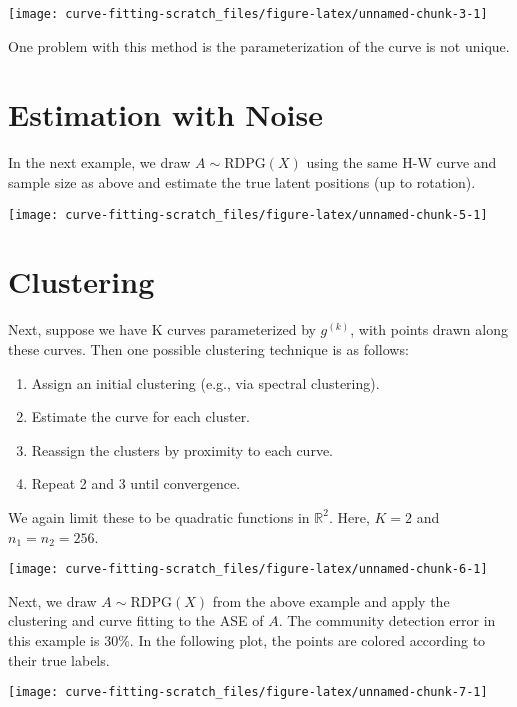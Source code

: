 \documentclass[
  11pt,
]{article}
\providecommand{\tightlist}{%
  \setlength{\itemsep}{0pt}\setlength{\parskip}{0pt}}
\begin{document}
\begin{center}\texttt{[image: curve-fitting-scratch\_files/figure-latex/unnamed-chunk-3-1]} \end{center}

One problem with this method is the parameterization of the curve is not
unique.

\hypertarget{estimation-with-noise}{%
\section{Estimation with Noise}\label{estimation-with-noise}}

\begin{example}

In the next example, we draw $A \sim \mathrm{RDPG}(X)$ using the same H-W curve and sample size as above and estimate the true latent positions (up to rotation). 

\end{example}

\begin{center}\texttt{[image: curve-fitting-scratch\_files/figure-latex/unnamed-chunk-5-1]} \end{center}

\hypertarget{clustering}{%
\section{Clustering}\label{clustering}}

Next, suppose we have K curves parameterized by \(g^{(k)}\), with points
drawn along these curves. Then one possible clustering technique is as
follows:

\begin{enumerate}
\def\labelenumi{\arabic{enumi}.}
\tightlist
\item
  Assign an initial clustering (e.g., via spectral clustering).
\item
  Estimate the curve for each cluster.
\item
  Reassign the clusters by proximity to each curve.
\item
  Repeat 2 and 3 until convergence.
\end{enumerate}

\begin{example}

We again limit these to be quadratic functions in $\mathbb{R}^2$. 
Here, $K = 2$ and $n_1 = n_2 = 256$. 


\begin{center}\texttt{[image: curve-fitting-scratch\_files/figure-latex/unnamed-chunk-6-1]} \end{center}

Next, we draw $A \sim \mathrm{RDPG}(X)$ from the above example and apply the clustering and curve fitting to the ASE of $A$.
The community detection error in this example is 30\%.
In the following plot, the points are colored according to their true labels.


\begin{center}\texttt{[image: curve-fitting-scratch\_files/figure-latex/unnamed-chunk-7-1]} \end{center}

\end{example}
\end{document}
